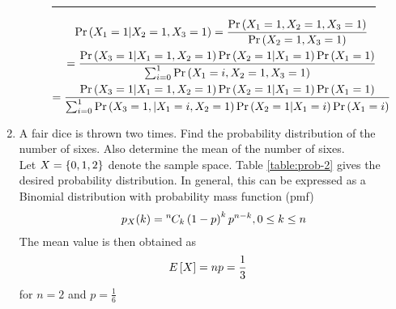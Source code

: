 \documentclass[journal,12pt,twocolumn]{IEEEtran}
\renewcommand\thesection{\arabic{section}}
\begin{document}
\begin{enumerate}[label=\thesection.\arabic*.,ref=\thesection.\theenumi]
		\begin{figure}[!b]
			\hrule
		\begin{multline}
			\Pr\left(X_1 = 1|X_2 = 1, X_3=1\right) 
			= \frac{\Pr\left(X_1 = 1,X_2 = 1, X_3=1\right)}{\Pr\left(X_2 = 1, X_3=1\right)}
			\\
			= \frac{\Pr\left(X_3 = 1 | X_1 = 1, X_2=1\right)\Pr\left(X_2 = 1| X_1 = 1\right)\Pr\left(X_1=1\right)}{\sum_{i=0}^{1}\Pr\left(X_1 = i, X_2 = 1, X_3=1\right)}
			\\
			= \frac{\Pr\left(X_3 = 1 | X_1 = 1, X_2=1\right)\Pr\left(X_2 = 1| X_1 = 1\right)\Pr\left(X_1=1\right)}{\sum_{i=0}^{1}\Pr\left(X_3=1,| X_1 = i, X_2 = 1 \right)\Pr\left(X_2 = 1| X_1 = i\right)\Pr\left(X_1=i\right)}
			\label{eq:prob-1}
		\end{multline}
		\end{figure}
\item A fair dice is thrown two times. Find the probability distribution of the number of sixes. Also determine the mean of the number of sixes.\\
	\solution Let $X = \left\{0,1,2\right\}$ denote the sample space.  
		Table 
	\eqref{table:prob-2}
		gives the desired probability distribution.  In general, this can be expressed as a Binomial distribution with probability mass function (pmf)
		\begin{align}
			p_X(k) = {{}^{n}\mkern-1muC_{k}}\left(1-p\right)^{k}p^{n-k}, 0 \le k \le n
		\end{align}
		The mean value is then obtained as
		\begin{align}
			E\left[ X \right] &= np = \frac{1}{3}
		\end{align}
		for $n = 2$ and $p = \frac{1}{6}$
\begin{table}[!htb]
	
\caption{}
	\label{table:prob-2}
\end{table}
\end{enumerate}
\end{document}

